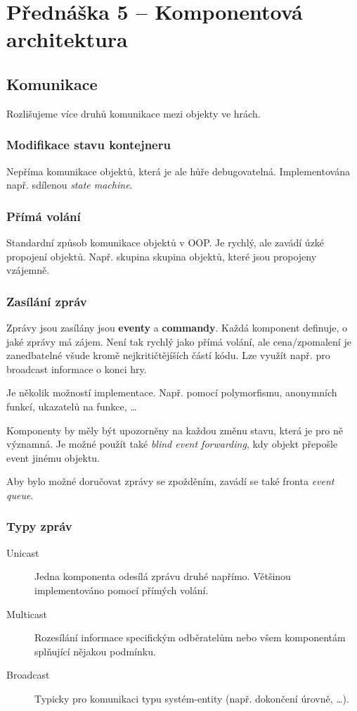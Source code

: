 \section{Přednáška 5 -- Komponentová architektura}

\subsection*{Komunikace}

Rozlišujeme více druhů komunikace mezi objekty ve hrách.

\subsubsection*{Modifikace stavu kontejneru}

Nepříma komunikace objektů, která je ale hůře debugovatelná.
Implementována např. sdílenou \textit{state machine}.

\subsubsection*{Přímá volání}

Standardní způsob komunikace objektů v OOP.
Je rychlý, ale zavádí úzké propojení objektů.
Např. skupina skupina objektů, které jsou propojeny vzájemně.

\subsubsection*{Zasílání zpráv}

Zprávy jsou zasílány jsou \textbf{eventy} a \textbf{commandy}.
Každá komponent definuje, o jaké zprávy má zájem.
Není tak rychlý jako přímá volání, ale cena/zpomalení je zanedbatelné všude kromě nejkritičtějíších částí kódu.
Lze využít např. pro broadcast informace o konci hry.

Je několik možností implementace.
Např. pomocí polymorfismu, anonymních funkcí, ukazatelů na funkce, \dots

Komponenty by měly být upozorněny na každou změnu stavu, která je pro ně významná.
Je možné použít také \textit{blind event forwarding}, kdy objekt přepošle event jinému objektu.

Aby bylo možné doručovat zprávy se zpožděním, zavádí se také fronta \textit{event queue}.

\subsubsection*{Typy zpráv}

\medskip

\begin{description}
    \item[Unicast] Jedna komponenta odesílá zprávu druhé napřímo. Většinou implementováno pomocí přímých volání.
    \item[Multicast] Rozesílání informace specifickým odběratelům nebo všem komponentám splňující nějakou podmínku.
    \item[Broadcast] Typicky pro komunikaci typu systém-entity (např. dokončení úrovně, \dots).
\end{description}
